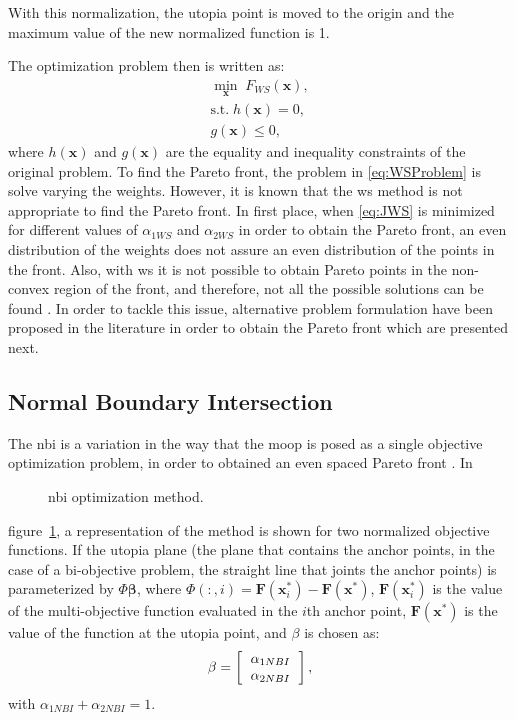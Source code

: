 With this normalization, the utopia point is moved to the origin and the maximum value of the new normalized function is 1.

The optimization problem then is written as:
\begin{equation}
\begin{gathered}
\min_{\mathbf{x}}{\; F_{WS}(\mathbf{x})}, \\
\text{s.t.} \; h(\mathbf{x})=0, \\
g(\mathbf{x}) \leq 0,
\end{gathered}
\label{eq:WSProblem}
\end{equation}
%
where $h(\mathbf{x})$ and $g(\mathbf{x})$ are the equality and inequality constraints of the original problem. To find the Pareto front, the problem in \eqref{eq:WSProblem} is solve varying the weights. However, it is known that the \gls{ws} method is not appropriate to find the Pareto front. In first place, when \eqref{eq:JWS} is minimized for different values of $\alpha_{1WS}$ and $\alpha_{2WS}$ in order to obtain the Pareto front, an even distribution of the weights does not assure an even distribution of the points in the front. Also, with \gls{ws} it is not possible to obtain Pareto points in the non-convex region of the front, and therefore, not all the possible solutions can be found \cite{Das1997}. In order to tackle this issue, alternative problem formulation have been proposed in the literature in order to obtain the Pareto front which are presented next.
\subsection{Normal Boundary Intersection}
\label{sec:NBI}
%
The \gls{nbi} is a variation in the way that the \gls{moop} is posed as a single objective optimization problem, in order to obtained an even spaced Pareto front \cite{Das1998}. In %
%
\begin{figure}%
	\centering
	\caption{\gls{nbi} optimization method.}%
	\label{fig:NBI}%
\end{figure}
%
figure~\ref{fig:NBI}, a representation of the method is shown for two normalized objective functions. If the utopia plane (the plane that contains the anchor points, in the case of a bi-objective problem, the straight line that joints the anchor points) is parameterized by $\Phi\mathbf{\beta}$, where $\Phi(:,i)=\mathbf{F}(\mathbf{x}_i^*)-\mathbf{F}(\mathbf{x}^*)$, $\mathbf{F}(\mathbf{x}_i^*)$ is the value of the multi-objective function evaluated in the $i$th anchor point, $\mathbf{F}(\mathbf{x}^*)$ is the value of the function at the utopia point, and $\beta$ is chosen as:
\begin{equation}
\beta=
\left[\begin{tabular}{c}
$\alpha_{1NBI}$ \\ $\alpha_{2NBI}$
\end{tabular}\right],
\label{eq:Beta}
\end{equation}
with $\alpha_{1NBI}+\alpha_{2NBI}=1$.


